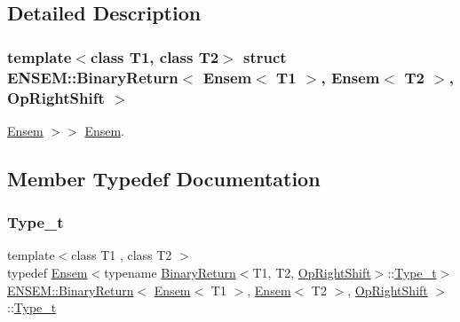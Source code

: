 \subsection{Detailed Description}
\subsubsection*{template$<$class T1, class T2$>$\newline
struct E\+N\+S\+E\+M\+::\+Binary\+Return$<$ Ensem$<$ T1 $>$, Ensem$<$ T2 $>$, Op\+Right\+Shift $>$}

\mbox{\hyperlink{classENSEM_1_1Ensem}{Ensem}} $>$$>$ \mbox{\hyperlink{classENSEM_1_1Ensem}{Ensem}}. 

\subsection{Member Typedef Documentation}
\mbox{\label{structENSEM_1_1BinaryReturn_3_01Ensem_3_01T1_01_4_00_01Ensem_3_01T2_01_4_00_01OpRightShift_01_4_a5f572b84bf6bd1cdf73ee915255349dc}} 
\subsubsection{\texorpdfstring{Type\_t}{Type\_t}\hspace{0.1cm}{\footnotesize\ttfamily [1/3]}}
{\footnotesize\ttfamily template$<$class T1 , class T2 $>$ \\
typedef \mbox{\hyperlink{classENSEM_1_1Ensem}{Ensem}}$<$typename \mbox{\hyperlink{structENSEM_1_1BinaryReturn}{Binary\+Return}}$<$T1, T2, \mbox{\hyperlink{structENSEM_1_1OpRightShift}{Op\+Right\+Shift}}$>$\+::\mbox{\hyperlink{structENSEM_1_1BinaryReturn_3_01Ensem_3_01T1_01_4_00_01Ensem_3_01T2_01_4_00_01OpRightShift_01_4_a5f572b84bf6bd1cdf73ee915255349dc}{Type\+\_\+t}}$>$ \mbox{\hyperlink{structENSEM_1_1BinaryReturn}{E\+N\+S\+E\+M\+::\+Binary\+Return}}$<$ \mbox{\hyperlink{classENSEM_1_1Ensem}{Ensem}}$<$ T1 $>$, \mbox{\hyperlink{classENSEM_1_1Ensem}{Ensem}}$<$ T2 $>$, \mbox{\hyperlink{structENSEM_1_1OpRightShift}{Op\+Right\+Shift}} $>$\+::\mbox{\hyperlink{structENSEM_1_1BinaryReturn_3_01Ensem_3_01T1_01_4_00_01Ensem_3_01T2_01_4_00_01OpRightShift_01_4_a5f572b84bf6bd1cdf73ee915255349dc}{Type\+\_\+t}}}

